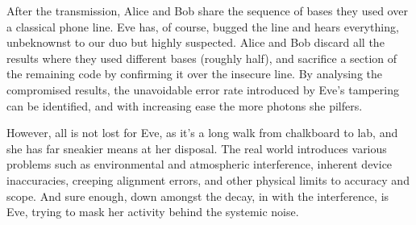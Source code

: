 \documentclass[journal]{vgtc}
\begin{document}
\noindent After the transmission, Alice and Bob share the sequence of bases they used over a classical phone line. Eve has, of course, bugged the line and hears everything, unbeknownst to our duo but highly suspected. Alice and Bob discard all the results where they used different bases (roughly half), and sacrifice a section of the remaining code by confirming it over the insecure line. By analysing the compromised results, the unavoidable error rate introduced by Eve's tampering can be identified, and with increasing ease the more photons she pilfers.

\noindent However, all is not lost for Eve, as it's a long walk from chalkboard to lab, and she has far sneakier means at her disposal. The real world introduces various problems such as environmental and atmospheric interference, inherent device inaccuracies, creeping alignment errors, and other physical limits to accuracy and scope. And sure enough, down amongst the decay, in with the interference, is Eve, trying to mask her activity behind the systemic noise.
\end{document}
